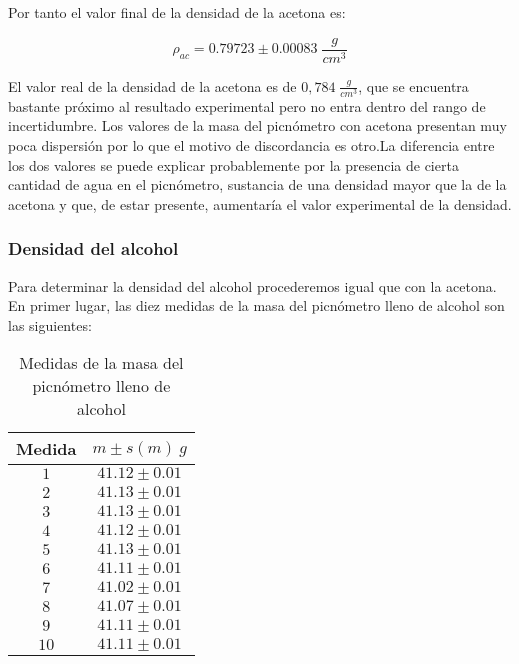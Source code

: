 \documentclass[a4paper,12pt,titlepage]{article}
\begin{document}
Por tanto el valor final de la densidad de la acetona es:

\begin{equation}
    \rho_{ac} = 0.79723 \pm 0.00083 \; \frac{g}{cm^3}
\end{equation}

El valor real de la densidad de la acetona es de $0,784 \; \frac{g}{cm^3}$, que se encuentra bastante próximo al resultado experimental pero no entra dentro del rango de incertidumbre. Los valores de la masa del picnómetro con acetona presentan muy poca dispersión por lo que el motivo de discordancia es otro.La diferencia entre los dos valores se puede explicar probablemente por la presencia de cierta cantidad de agua en el picnómetro, sustancia de una densidad mayor que la de la acetona y que, de estar presente, aumentaría el valor experimental de la densidad. 

\newpage

\subsubsection{Densidad del alcohol}

Para determinar la densidad del alcohol procederemos igual que con la acetona. En primer lugar, las diez medidas de la masa del picnómetro lleno de alcohol son las siguientes:

\begin{table}[h!]
    \centering
    \begin{tabular}{|c|c|}
    \hline
    Medida & $m \pm s(m) \: g$   \\ \hline
    $1$    & $41.12\pm0.01$ \\ \hline
    $2$    & $41.13\pm0.01$ \\ \hline
    $3$    & $41.13\pm0.01$ \\ \hline
    $4$    & $41.12\pm0.01$ \\ \hline
    $5$    & $41.13\pm0.01$ \\ \hline
    $6$    & $41.11\pm0.01$ \\ \hline
    $7$    & $41.02\pm0.01$ \\ \hline
    $8$    & $41.07\pm0.01$ \\ \hline
    $9$    & $41.11\pm0.01$ \\ \hline
    $10$   & $41.11\pm0.01$ \\ \hline
    \end{tabular}
    \caption{Medidas de la masa del picnómetro lleno de alcohol}
    \label{Masas Alcohol}
    \end{table}
\end{document}

